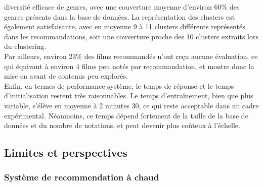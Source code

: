 \documentclass{article}
\begin{document}
diversité efficace de genres, avec une couverture moyenne d’environ 60\% des genres présents dans la base de données.
La représentation des clusters est également satisfaisante, avec en moyenne 9 à 11 clusters différents représentés dans
les recommandations, soit une couverture proche des 10 clusters extraits lors du clustering.\\
Par ailleurs, environ 23\% des films recommandés n’ont reçu aucune évaluation, ce qui équivaut à environ 4 films peu notés
par recommandation, et montre donc la mise en avant de contenus peu explorés.\\
Enfin, en termes de performance système, le temps de réponse et le temps d’initialisation restent très raisonnables. Le temps d’entraînement, bien que plus variable, s’élève en moyenne à 2 minutes 30, ce qui reste acceptable dans un cadre expérimental. Néanmoins, ce temps dépend fortement de la taille de la base de données et du nombre de notations, et peut devenir plus coûteux à l’échelle.

\subsection{Limites et perspectives}
\subsubsection{Système de recommendation à chaud}
$ $\\
\\
\\
\\
\\
\\
\\
\end{document}
